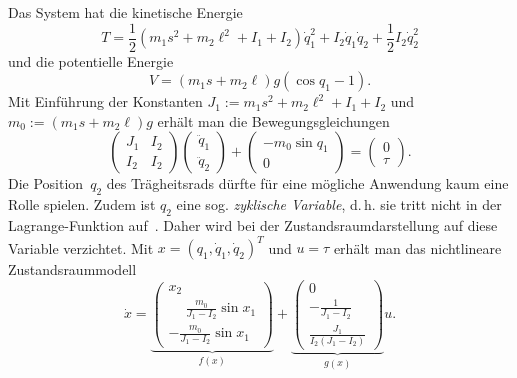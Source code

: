 Das System hat die kinetische Energie
\[
T=\frac{1}{2}\left(m_{1}s^{2}+m_{2}\ell^{2}+I_{1}+I_{2}\right)\dot{q}_{1}^{2}+I_{2}\dot{q}_{1}\dot{q}_{2}+\frac{1}{2}I_{2}\dot{q}_{2}^{2}
\]
und die potentielle Energie 
\[
V=\left(m_{1}s+m_{2}\ell\right)g\left(\cos q_{1}-1\right).
\]
Mit Einführung der Konstanten $J_{1}:=m_{1}s^{2}+m_{2}\ell^{2}+I_{1}+I_{2}$
und $m_{0}:=\left(m_{1}s+m_{2}\ell\right)g$ erhält man die Bewegungsgleichungen
\[
\left(\begin{array}{cc}
J_{1} & I_{2}\\
I_{2} & I_{2}
\end{array}\right)\left(\begin{array}{c}
\ddot{q}_{1}\\
\ddot{q}_{2}
\end{array}\right)+\left(\begin{array}{c}
-m_{0}\sin q_{1}\\
0
\end{array}\right)=\left(\begin{array}{c}
0\\
\tau
\end{array}\right).
\]
Die Position~$q_{2}$ des Trägheitsrads dürfte für eine mögliche
Anwendung kaum eine Rolle spielen. Zudem ist $q_{2}$ eine sog. \textit{zyklische
Variable}, d.\,h. sie tritt nicht in der Lagrange-Funktion auf~\cite{nolting2}.
Daher wird bei der Zustandsraumdarstellung auf diese Variable verzichtet.
Mit $x=(q_{1},\dot{q}_{1},\dot{q}_{2})^{T}$ und $u=\tau$ erhält
man das nichtlineare Zustandsraummodell 
\begin{equation}
\dot{x}=\underbrace{\left(\begin{array}{c}
x_{2}\\
\phantom{-}\frac{m_{0}}{J_{1}-I_{2}}\sin x_{1}\\
-\frac{m_{0}}{J_{1}-I_{2}}\sin x_{1}
\end{array}\right)}_{{\displaystyle f(x)}}+\underbrace{\left(\begin{array}{c}
0\\
-\frac{1}{J_{1}-I_{2}}\\
\frac{J_{1}}{I_{2}(J_{1}-I_{2})}
\end{array}\right)}_{{\displaystyle g(x)}}u.\label{eq:system-inverses-pendel-mit-traegheitsrad}
\end{equation}

